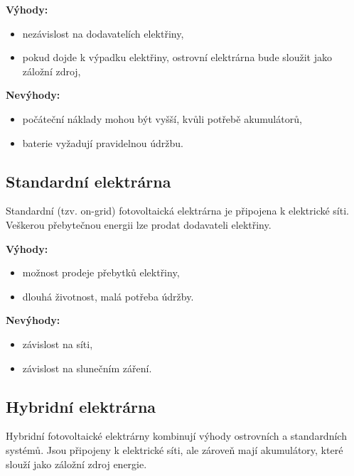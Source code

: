 \begin{multicols}{2}
    \textbf{Výhody:}
    \begin{itemize}[leftmargin=*]
        \item nezávislost na dodavatelích elektřiny,
        \item pokud dojde k výpadku elektřiny, ostrovní elektrárna bude sloužit jako záložní zdroj,
    \end{itemize}
    
    \columnbreak
    
    \textbf{Nevýhody:}
    \begin{itemize}[leftmargin=*]
        \item počáteční náklady mohou být vyšší, kvůli potřebě akumulátorů,
        \item baterie vyžadují pravidelnou údržbu.
    \end{itemize}
\end{multicols}

\subsection{Standardní elektrárna}

Standardní (tzv. on-grid) fotovoltaická elektrárna je připojena k elektrické síti.
Veškerou přebytečnou energii lze prodat dodavateli elektřiny.

\begin{multicols}{2}
    \textbf{Výhody:}
    \begin{itemize}[leftmargin=*]
        \item možnost prodeje přebytků elektřiny,
        \item dlouhá životnost, malá potřeba údržby.
    \end{itemize}
    
    \columnbreak
    
    \textbf{Nevýhody:}
    \begin{itemize}[leftmargin=*]
        \item závislost na síti,
        \item závislost na slunečním záření.
    \end{itemize}
\end{multicols}


\subsection{Hybridní elektrárna}

Hybridní fotovoltaické elektrárny kombinují výhody ostrovních a standardních systémů.
Jsou připojeny k elektrické síti, ale zároveň mají akumulátory, které slouží jako záložní zdroj energie.

